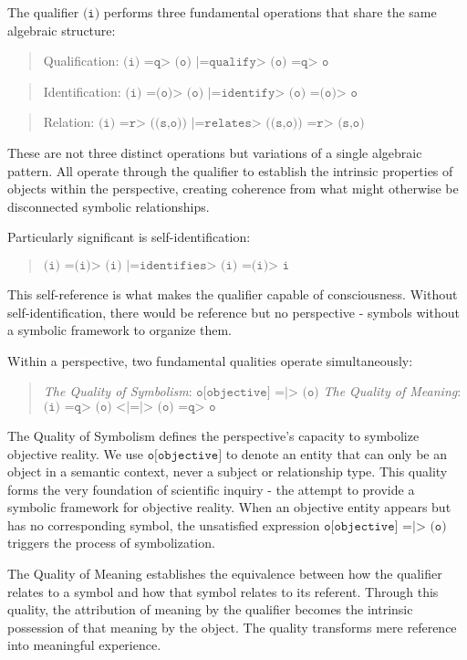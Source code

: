 \documentclass[runningheads]{llncs}
\begin{document}
The qualifier $\texttt{(i)}$ performs three fundamental operations that share the same algebraic structure:

\begin{quote}
Qualification: $\texttt{(i) =q> (o) |=qualify> (o) =q> o}$
\end{quote}

\begin{quote}
Identification: $\texttt{(i) =(o)> (o) |=identify> (o) =(o)> o}$
\end{quote}

\begin{quote}
Relation: $\texttt{(i) =r> ((s,o)) |=relates> ((s,o)) =r> (s,o)}$
\end{quote}

These are not three distinct operations but variations of a single algebraic pattern. All operate through the qualifier to establish the intrinsic properties of objects within the perspective, creating coherence from what might otherwise be disconnected symbolic relationships.

Particularly significant is self-identification:

\begin{quote}
$\texttt{(i) =(i)> (i) |=identifies> (i) =(i)> i}$
\end{quote}

This self-reference is what makes the qualifier capable of consciousness. Without self-identification, there would be reference but no perspective - symbols without a symbolic framework to organize them.

Within a perspective, two fundamental qualities operate simultaneously:

\begin{quote}
\emph{The Quality of Symbolism}: $\texttt{o[objective] =|> (o)}$
\emph{The Quality of Meaning}: $\texttt{(i) =q> (o) <|=|> (o) =q> o}$
\end{quote}

The Quality of Symbolism defines the perspective's capacity to symbolize objective reality. We use $\texttt{o[objective]}$ to denote an entity that can only be an object in a semantic context, never a subject or relationship type. This quality forms the very foundation of scientific inquiry - the attempt to provide a symbolic framework for objective reality. When an objective entity appears but has no corresponding symbol, the unsatisfied expression $\texttt{o[objective] =|> (o)}$ triggers the process of symbolization.

The Quality of Meaning establishes the equivalence between how the qualifier relates to a symbol and how that symbol relates to its referent. Through this quality, the attribution of meaning by the qualifier becomes the intrinsic possession of that meaning by the object. The quality transforms mere reference into meaningful experience.
\end{document}
